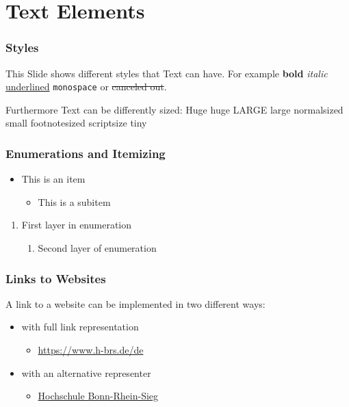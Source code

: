 \section{Text Elements}

    \begin{frame}
        \frametitle{Styles}
        This Slide shows different styles that Text can have. For example \textbf{bold} \textit{italic} \underline{underlined} \texttt{monospace} or \sout{canceled out}.
        
        Furthermore Text can be differently sized:
        \Huge{Huge}
        \huge{huge}
        \LARGE{LARGE}
        \large{large}
        \normalsize{normalsized}
        \small{small}
        \footnotesize{footnotesized}
        \scriptsize{scriptsize}
        \tiny{tiny}
    \end{frame}
    
    \begin{frame}
        \frametitle{Enumerations and Itemizing}
        \begin{itemize}
            \item{This is an item}
            \begin{itemize}
                \item{This is a subitem}
            \end{itemize}
        \end{itemize}
        \begin{enumerate}
            \item{First layer in enumeration}
            \begin{enumerate}
                \item{Second layer of enumeration}
            \end{enumerate}
        \end{enumerate}
    \end{frame}
    
    \begin{frame}
        \frametitle{Links to Websites}
        A link to a website can be implemented in two different ways:
        \begin{itemize}
            \item{with full link representation}
            \begin{itemize}
                \item{\href{https://www.h-brs.de/de}{https://www.h-brs.de/de}}
            \end{itemize}
            \item{with an alternative representer}
            \begin{itemize}
                \item{\href{https://www.h-brs.de/de}{Hochschule Bonn-Rhein-Sieg}}
            \end{itemize}
        \end{itemize}
    \end{frame}

